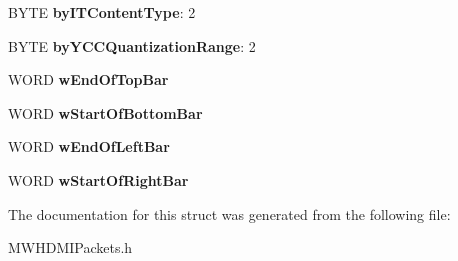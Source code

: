 \begin{DoxyCompactItemize}
\item 
\hypertarget{struct__HDMI__AVI__INFOFRAME__PAYLOAD_aa01419f1048875ddaf3b31cd70dd035a}{B\-Y\-T\-E {\bfseries by\-I\-T\-Content\-Type}\-: 2}\label{struct__HDMI__AVI__INFOFRAME__PAYLOAD_aa01419f1048875ddaf3b31cd70dd035a}

\item 
\hypertarget{struct__HDMI__AVI__INFOFRAME__PAYLOAD_a3e3fabe7520c543b33271d4733367879}{B\-Y\-T\-E {\bfseries by\-Y\-C\-C\-Quantization\-Range}\-: 2}\label{struct__HDMI__AVI__INFOFRAME__PAYLOAD_a3e3fabe7520c543b33271d4733367879}

\item 
\hypertarget{struct__HDMI__AVI__INFOFRAME__PAYLOAD_a88fc38ab3be51e89d158e7ec51a97cb4}{W\-O\-R\-D {\bfseries w\-End\-Of\-Top\-Bar}}\label{struct__HDMI__AVI__INFOFRAME__PAYLOAD_a88fc38ab3be51e89d158e7ec51a97cb4}

\item 
\hypertarget{struct__HDMI__AVI__INFOFRAME__PAYLOAD_a5ec5d5e306184660e4477eb9c2eabb54}{W\-O\-R\-D {\bfseries w\-Start\-Of\-Bottom\-Bar}}\label{struct__HDMI__AVI__INFOFRAME__PAYLOAD_a5ec5d5e306184660e4477eb9c2eabb54}

\item 
\hypertarget{struct__HDMI__AVI__INFOFRAME__PAYLOAD_af2d3f05fed46ce6683f26d0ec9b7821b}{W\-O\-R\-D {\bfseries w\-End\-Of\-Left\-Bar}}\label{struct__HDMI__AVI__INFOFRAME__PAYLOAD_af2d3f05fed46ce6683f26d0ec9b7821b}

\item 
\hypertarget{struct__HDMI__AVI__INFOFRAME__PAYLOAD_a4b35b8fe4b01e797e9b2b3efe8b2426a}{W\-O\-R\-D {\bfseries w\-Start\-Of\-Right\-Bar}}\label{struct__HDMI__AVI__INFOFRAME__PAYLOAD_a4b35b8fe4b01e797e9b2b3efe8b2426a}

\end{DoxyCompactItemize}


The documentation for this struct was generated from the following file\-:\begin{DoxyCompactItemize}
\item 
M\-W\-H\-D\-M\-I\-Packets.\-h\end{DoxyCompactItemize}
